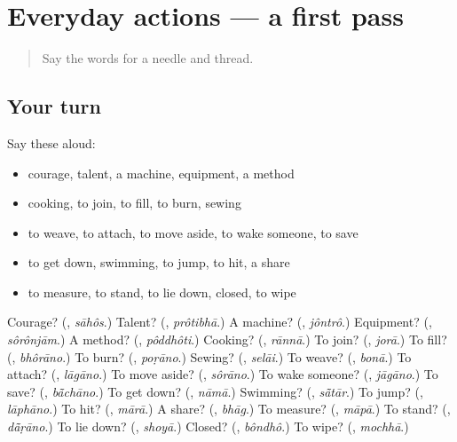 \section[(dialogue)]{Everyday actions — a first pass}

\label{lesson:BN-R109-first-pass-everyday-actions}



\begin{quote}
Say the words for a needle and thread.
\end{quote}

\subsection*{Your turn}
Say these aloud:

\begin{itemize}
\raggedright
  \item courage, talent, a machine, equipment, a method
  \item cooking, to join, to fill, to burn, sewing
  \item to weave, to attach, to move aside, to wake someone, to save
  \item to get down, swimming, to jump, to hit, a share
  \item to measure, to stand, to lie down, closed, to wipe
\end{itemize}

\begin{tcolorbox}[breakable,colback=teal!4,colframe=teal!35!black,title={Before you move on}]
Courage? (\textbf{}, \emph{sāhôs}.) Talent? (\textbf{}, \emph{prôtibhā}.) A machine? (\textbf{}, \emph{jôntrô}.) Equipment? (\textbf{}, \emph{sôrônjām}.) A method? (\textbf{}, \emph{pôddhôti}.) Cooking? (\textbf{}, \emph{rānnā}.) To join? (\textbf{}, \emph{jorā}.) To fill? (\textbf{}, \emph{bhôrāno}.) To burn? (\textbf{}, \emph{poṛāno}.) Sewing? (\textbf{}, \emph{selāi}.) To weave? (\textbf{}, \emph{bonā}.) To attach? (\textbf{}, \emph{lāgāno}.) To move aside? (\textbf{}, \emph{sôrāno}.) To wake someone? (\textbf{}, \emph{jāgāno}.) To save? (\textbf{}, \emph{bā̃chāno}.) To get down? (\textbf{}, \emph{nāmā}.) Swimming? (\textbf{}, \emph{sā̃tār}.) To jump? (\textbf{}, \emph{lāphāno}.) To hit? (\textbf{}, \emph{mārā}.) A share? (\textbf{}, \emph{bhāg}.) To measure? (\textbf{}, \emph{māpā}.) To stand? (\textbf{}, \emph{dā̃ṛāno}.) To lie down? (\textbf{}, \emph{shoyā}.) Closed? (\textbf{}, \emph{bôndhô}.) To wipe? (\textbf{}, \emph{mochhā}.)
\end{tcolorbox}
